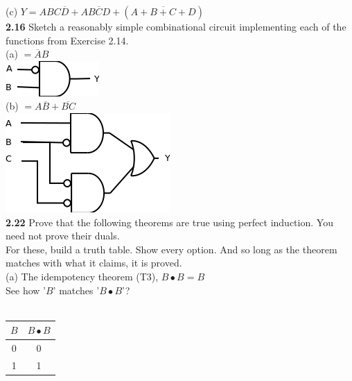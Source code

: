 \documentclass[12pt,a4paper]{report}
\newcommand*{\al}{\overline{A}}
\newcommand*{\bl}{\overline{B}}
\begin{document}
\begin{normalsize}
(c) $ Y = ABC\overline{D} + A\overline{BCD} + (\overline{A + B + C + D}) $ \\

\textbf{2.16} Sketch a reasonably simple combinational circuit implementing each of the functions from Exercise 2.14.\\
(a) $ = \al{}B $ \\
\includegraphics[scale=1]{2_16A} \\

(b) $ = A\bl{} + \overline{BC} $ \\
\includegraphics[scale=1]{2_16B} \\

\textbf{2.22} Prove that the following theorems are true using perfect induction. You need not prove their duals.\\

For these, build a truth table. Show every option. And so long as the theorem matches with what it claims, it is proved. \\

(a) The idempotency theorem (T3), $ B \bullet B = B $ \\
See how '$ B $' matches '$ B \bullet B $'? \\ \\
\begin{tabular}{|c|c|}
$ B $ & $ B \bullet B $ \\ 
\hline 
0 & 0 \\ 
\hline 
1 & 1 \\ 
\hline 
\end{tabular} \\ \\


\end{normalsize}
\end{document}
